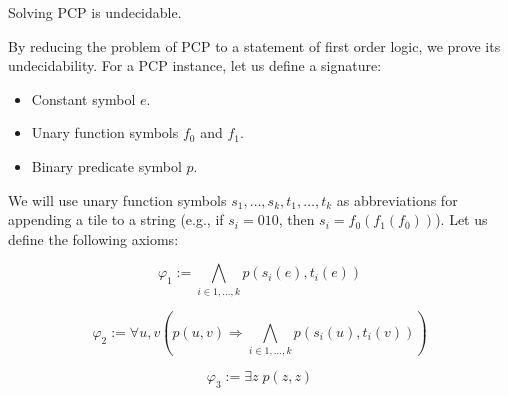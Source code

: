 \begin{theorem}
    Solving PCP is undecidable.
\end{theorem}

By reducing the problem of PCP to a statement of first order logic, we prove its undecidability. For a PCP instance, let us define a signature:
\begin{itemize}
    \item Constant symbol $e$.
    \item Unary function symbols $f_0$ and $f_1$.
    \item Binary predicate symbol $p$.
\end{itemize}

We will use unary function symbols $s_1, \ldots, s_k, t_1, \ldots, t_k$ as abbreviations for appending a tile to a string (e.g., if $s_i = 010$, then $s_i = f_0(f_1(f_0))$).
Let us define the following axioms:

$$\varphi_1 := \bigwedge_{i \in 1, \ldots, k} p(s_i(e), t_i(e))$$

$$\varphi_2 := \forall u, v \left(p(u, v) \Rightarrow \bigwedge_{i \in 1, \ldots, k} p(s_i(u), t_i(v))\right)$$

$$\varphi_3 := \exists z \; p(z, z)$$

